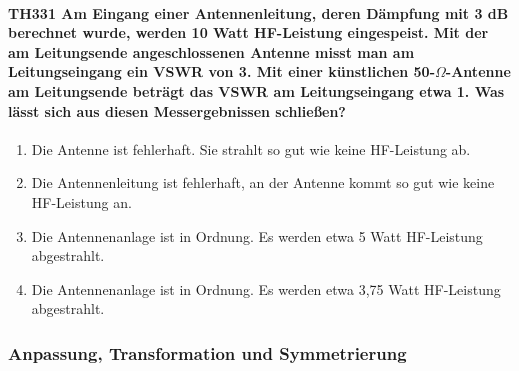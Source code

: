 \documentclass[8pt]{article}
\begin{document}
\paragraph*{TH331 Am Eingang einer Antennenleitung, deren Dämpfung mit 3 dB berechnet wurde, werden 10 Watt HF-Leistung eingespeist. Mit der am Leitungsende angeschlossenen Antenne misst man am Leitungseingang ein VSWR von 3. Mit einer künstlichen 50-$\Omega$-Antenne am Leitungsende beträgt das VSWR am Leitungseingang etwa 1. Was lässt sich aus diesen Messergebnissen schließen?}
\begin{enumerate}[nolistsep,label=\Alph*]
\item Die Antenne ist fehlerhaft. Sie strahlt so gut wie keine HF-Leistung ab. 
\item Die Antennenleitung ist fehlerhaft, an der Antenne kommt so gut wie keine HF-Leistung an.
\item Die Antennenanlage ist in Ordnung. Es werden etwa 5 Watt HF-Leistung abgestrahlt.
\item Die Antennenanlage ist in Ordnung. Es werden etwa 3,75 Watt HF-Leistung abgestrahlt.
\end{enumerate}

\pagebreak
\subsubsection{Anpassung, Transformation und Symmetrierung}
\end{document}
